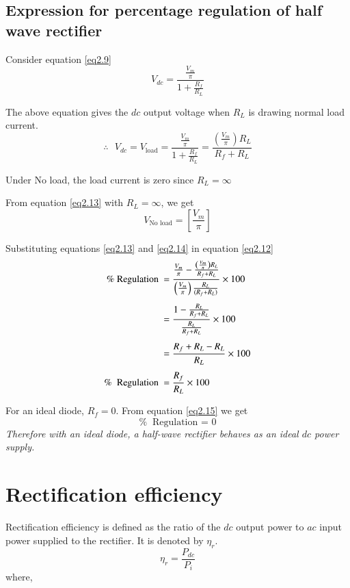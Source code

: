 \subsection{Expression for percentage regulation of half wave
  rectifier}\label{subsec2.4.1}

Consider equation \eqref{eq2.9}
$$
V_{dc} = \frac{\frac{V_m}{\pi}}{1 + \frac{R_f}{R_L}}
$$

The above equation gives the $dc$ output voltage when $R_L$ is drawing
normal load current.
\begin{equation}
\therefore ~~~ V_{dc} = V_{\text{load}} = \frac{\frac{V_m}{\pi}}{1 +
  \frac{R_f}{R_L}} = \frac{\left(\frac{V_m}{\pi} \right) R_L}{R_f+  R_L} \label{eq2.13}
\end{equation}

Under No load, the load current is zero since $R_L = \infty$

From equation \eqref{eq2.13} with  $R_L = \infty$, we get
\begin{equation}
V_{\text{No load}} = \left[ \frac{V_m}{\pi} \right] \label{eq2.14}
\end{equation}

Substituting equations \eqref{eq2.13} and \eqref{eq2.14} in equation
\eqref{eq2.12}
\begin{align}
\% ~ \text{Regulation } & = \frac{\frac{V_m}{\pi} -
  \frac{\left(\frac{V_m}{\pi} \right) R_L}{R_f + R_L}}{
  \left(\frac{V_m}{\pi} \right) \frac{R_L}{(R_f + R_L)}} \times 100 \notag\\[4pt]
& = \frac{1- \frac{R_L}{R_f + R_L}}{\frac{R_L}{R_f + R_L}} \times
100 \notag\\[4pt]
& = \frac{R_f + R_L - R_L}{R_L} \times 100 \notag\\[4pt]
\% ~ \text{ Regulation } & = \frac{R_f}{R_L} \times 100 \label{eq2.15}
\end{align}

For an ideal diode, $R_f = 0$. From equation \eqref{eq2.15} we get
$$
\% ~ \text{ Regulation = 0}
$$
{\em Therefore with an ideal diode, a half-wave rectifier behaves as an
ideal $dc$ power supply.}

\section{Rectification efficiency}\label{sec2.5}

Rectification efficiency is defined as the ratio of the $dc$ output
power to $ac$ input power supplied to the rectifier. It is denoted by
$\eta_r$.
\begin{equation}
\eta_r = \frac{P_{dc}}{P_i} \label{eq2.16}
\end{equation}
where,

